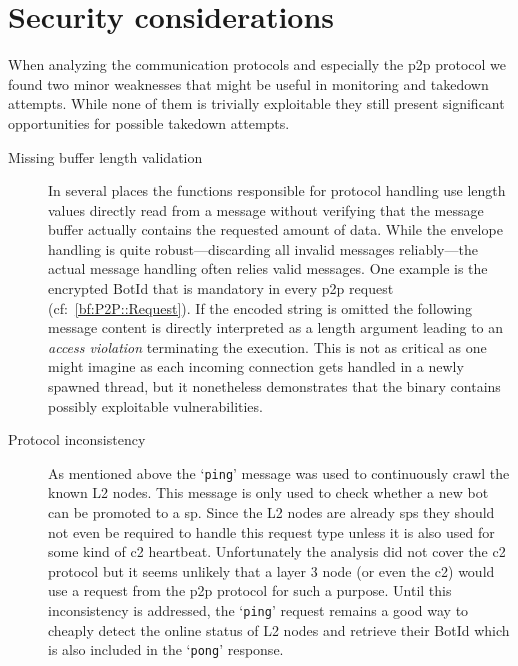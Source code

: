 

\section{Security considerations\label{sec:Evaluation::Security_considerations}}
When analyzing the communication protocols and especially the \gls{p2p} protocol we found two minor weaknesses that might be useful in monitoring and takedown attempts.
While none of them is trivially exploitable they still present significant opportunities for possible takedown attempts.

\begin{description}
    \item[Missing buffer length validation]
    In several places the functions responsible for protocol handling use length values directly read from a message without verifying that the message buffer actually contains the requested amount of data.
    While the envelope handling is quite robust---discarding all invalid messages reliably---the actual message handling often relies valid messages.
    One example is the encrypted BotId that is mandatory in every \gls{p2p} request (cf:~\autoref{bf:P2P::Request}).
    If the encoded string is omitted the following message content is directly interpreted as a length argument leading to an \emph{access violation} terminating the execution.
    This is not as critical as one might imagine as each incoming connection gets handled in a newly spawned thread, but it nonetheless demonstrates that the binary contains possibly exploitable vulnerabilities.
    \item[Protocol inconsistency]
    As mentioned above the `\lstinline|ping|' message was used to continuously crawl the known L2 nodes.
    This message is only used to check whether a new \gls{bot} can be promoted to a \gls{sp}.
    Since the L2 nodes are already \glspl{sp} they should not even be required to handle this request type unless it is also used for some kind of \gls{c2} heartbeat.
    Unfortunately the analysis did not cover the \gls{c2} protocol but it seems unlikely that a layer 3 node (or even the \gls{c2}) would use a request from the \gls{p2p} protocol for such a purpose.
    Until this inconsistency is addressed, the `\lstinline|ping|' request remains a good way to cheaply detect the online status of L2 nodes and retrieve their BotId which is also included in the `\lstinline|pong|' response.
\end{description}


